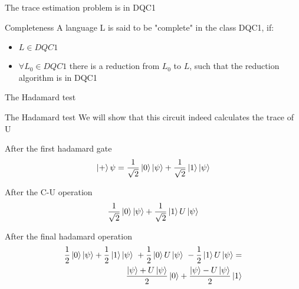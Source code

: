 \documentclass[leqno,fleqn]{beamer}
\begin{document}
\begin{frame}[label={sec:orgheadline7}]{The trace estimation problem is in DQC1}
\begin{block}{Completeness}
A language L is said to be "complete" in the class DQC1, if:
\begin{itemize}
\item \(L \in DQC1\)
\item \(\forall L_{0} \in DQC1\) there is a reduction from \(L_{0}\) to \(L\), such that the reduction algorithm is in DQC1
\end{itemize}
\end{block}
\end{frame}
\begin{frame}[label={sec:orgheadline8}]{The Hadamard test}
\end{frame}

\begin{frame}[label={sec:orgheadline9}]{The Hadamard test}
We will show that this circuit indeed calculates the trace of U
\begin{block}{After the first hadamard gate}
\begin{align*}
   \Ket{+}\psi = \frac{1}{\sqrt{2}}\Ket{0}\Ket{\psi} + \frac{1}{\sqrt{2}}\Ket{1}\Ket{\psi}
\end{align*}
\end{block}
\begin{block}{After the C-U operation}
\begin{align*}
   \frac{1}{\sqrt{2}}\Ket{0}\Ket{\psi} + \frac{1}{\sqrt{2}}\Ket{1}U\Ket{\psi}
\end{align*}
\end{block}
\begin{block}{After the final hadamard operation}
\begin{align*}
   \frac{1}{2}\Ket{0}\Ket{\psi} + \frac{1}{2}\Ket{1}\Ket{\psi}\ +\frac{1}{2}\Ket{0}U\Ket{\psi}\ -  \frac{1}{2}\Ket{1}U\Ket{\psi} = \\
   \frac{\Ket{\psi} + U\Ket{\psi}}{2}\Ket{0} + \frac{\Ket{\psi} - U\Ket{\psi}}{2}\Ket{1}
\end{align*}
\end{block}
\end{frame}
\end{document}
